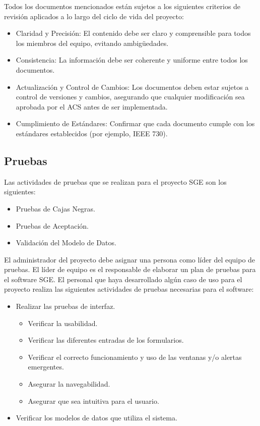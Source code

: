 \documentclass[a4paper,10pt]{article}
\begin{document}
	Todos los documentos mencionados están sujetos a los siguientes criterios de revisión aplicados a lo largo del ciclo de vida del proyecto:
	\begin{itemize}
		\item Claridad y Precisión: El contenido debe ser claro y comprensible para todos los miembros del equipo, evitando ambigüedades.
		\item Consistencia: La información debe ser coherente y uniforme entre todos los documentos.
		\item Actualización y Control de Cambios: Los documentos deben estar sujetos a control de versiones y cambios, asegurando que cualquier modificación sea aprobada por el ACS antes de ser implementada.
		\item Cumplimiento de Estándares: Confirmar que cada documento cumple con los estándares establecidos (por ejemplo, IEEE 730).
	\end{itemize}
	
	\subsection{Pruebas}
	Las actividades de pruebas que se realizan para el proyecto SGE son los siguientes:
	\begin{itemize}
		\item Pruebas de Cajas Negras.
		\item Pruebas de Aceptación.
		\item Validación del Modelo de Datos.
	\end{itemize}
	
	El administrador del proyecto debe asignar una persona como líder del equipo de pruebas. El líder de equipo es el responsable de elaborar un plan de pruebas para el software SGE. El personal que haya desarrollado algún caso de uso para el proyecto realiza las siguientes actividades de pruebas necesarias para el software:
	\begin{itemize}
		\item Realizar las pruebas de interfaz.
		\begin{itemize}
			\item Verificar la usabilidad.
			\item Verificar las diferentes entradas de los formularios.
			\item Verificar el correcto funcionamiento y uso de las ventanas y/o alertas emergentes.
			\item Asegurar la navegabilidad.
			\item Asegurar que sea intuitiva para el usuario.
		\end{itemize}
		\item Verificar los modelos de datos que utiliza el sistema.
	\end{itemize}
	
\end{document}
